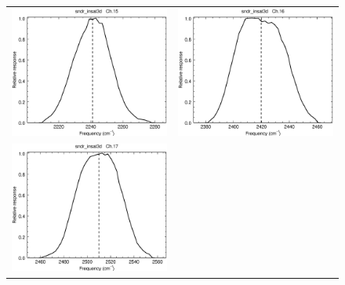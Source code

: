 \begin{figure}[H]
\begin{tabular}{c c}
    \includegraphics[scale=0.35]{graphics/sndr/srf/sndr_insat3d-15.eps} &
    \includegraphics[scale=0.35]{graphics/sndr/srf/sndr_insat3d-16.eps} \\
    \includegraphics[scale=0.35]{graphics/sndr/srf/sndr_insat3d-17.eps} &

\end{tabular}
\end{figure}
